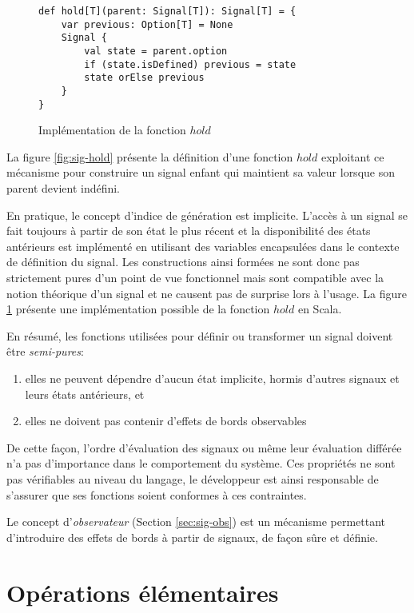 \begin{figure}
	\begin{lstlisting}
def hold[T](parent: Signal[T]): Signal[T] = {
	var previous: Option[T] = None
	Signal {
		val state = parent.option
		if (state.isDefined) previous = state
		state orElse previous
	}
}
	\end{lstlisting}
	\caption{Implémentation de la fonction $hold$}
	\label{fig:sig-hold-scala}
\end{figure}

La figure \ref{fig:sig-hold} présente la définition d'une fonction $hold$ exploitant ce mécanisme pour construire un signal enfant qui maintient sa valeur lorsque son parent devient indéfini.

En pratique, le concept d'indice de génération est implicite. L'accès à un signal se fait toujours à partir de son état le plus récent et la disponibilité des états antérieurs est implémenté en utilisant des variables encapsulées dans le contexte de définition du signal. Les constructions ainsi formées ne sont donc pas strictement pures d'un point de vue fonctionnel mais sont compatible avec la notion théorique d'un signal et ne causent pas de surprise lors à l'usage. La figure \ref{fig:sig-hold-scala} présente une implémentation possible de la fonction $hold$ en Scala.

En résumé, les fonctions utilisées pour définir ou transformer un signal doivent être \emph{semi-pures}:
\begin{enumerate}
	\item elles ne peuvent dépendre d'aucun état implicite, hormis d'autres signaux et leurs états antérieurs, et
	\item elles ne doivent pas contenir d'effets de bords observables
\end{enumerate}
De cette façon, l'ordre d'évaluation des signaux ou même leur évaluation différée n'a pas d'importance dans le comportement du système. Ces propriétés ne sont pas vérifiables au niveau du langage, le développeur est ainsi responsable de s'assurer que ses fonctions soient conformes à ces contraintes.

Le concept d'\emph{observateur} (Section \ref{sec:sig-obs}) est un mécanisme permettant d'introduire des effets de bords à partir de signaux, de façon sûre et définie.

\section*{Opérations élémentaires}

